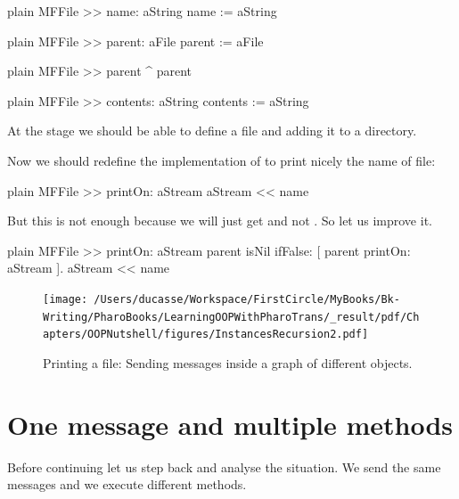 \documentclass[10pt,twoside,english]{_support/latex/sbabook/sbabook}
\begin{document}
\begin{displaycode}{plain}
MFFile >> name: aString
	name := aString
\end{displaycode}

\begin{displaycode}{plain}
MFFile >> parent: aFile
	parent := aFile
\end{displaycode}

\begin{displaycode}{plain}
MFFile >> parent
	^ parent
\end{displaycode}

\begin{displaycode}{plain}
MFFile >> contents: aString
	contents := aString
\end{displaycode}

At the stage we should be able to define a file and adding it to a directory.

Now we should redefine the implementation of  to print nicely the name of file:

\begin{displaycode}{plain}
MFFile >> printOn: aStream
	aStream << name
\end{displaycode}

But this is not enough because we will just get  and not .
So let us improve it.

\begin{displaycode}{plain}
MFFile >> printOn: aStream
	parent isNil ifFalse: [ 
		parent printOn: aStream ].
	aStream << name
\end{displaycode}


\begin{figure}

\begin{center}
\texttt{[image: /Users/ducasse/Workspace/FirstCircle/MyBooks/Bk-Writing/PharoBooks/LearningOOPWithPharoTrans/\_result/pdf/Chapters/OOPNutshell/figures/InstancesRecursion2.pdf]}\caption{Printing a file: Sending messages inside a graph of different objects. \label{InstancesRecursion2}}\end{center}
\end{figure}

\section{One message and multiple methods}
Before continuing let us step back and analyse the situation. We send the same messages and we execute different methods. 
\end{document}
